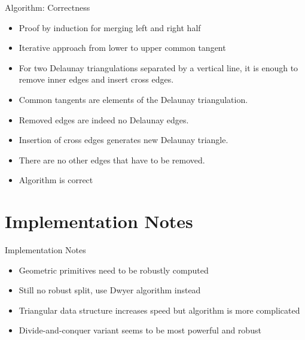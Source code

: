 \documentclass[aspectratio=169,fleqn]{beamer}
\begin{document}
  \begin{frame}{Algorithm: Correctness}
    \onslide<+->
    \begin{itemize}
      \item<+-> Proof by induction for merging left and right half
      \item<+-> Iterative approach from lower to upper common tangent
      \item<+-> For two Delaunay triangulations separated by a vertical line, it is enough to remove inner edges and insert cross edges.
      \item<+-> Common tangents are elements of the Delaunay triangulation.
      \item<+-> Removed edges are indeed no Delaunay edges.
      \item<+-> Insertion of cross edges generates new Delaunay triangle.
      \item<+-> There are no other edges that have to be removed.
      \item<+-> Algorithm is correct
    \end{itemize}
  \end{frame}

\section{Implementation Notes}
  \begin{frame}{Implementation Notes}
    \begin{itemize}
      \item<+-> Geometric primitives need to be robustly computed
      \item<+-> Still no robust split, use Dwyer algorithm instead %
      \item<+-> Triangular data structure increases speed but algorithm is more complicated
      \item<+-> Divide-and-conquer variant seems to be most powerful and robust
    \end{itemize}
  \end{frame}

\end{document}
